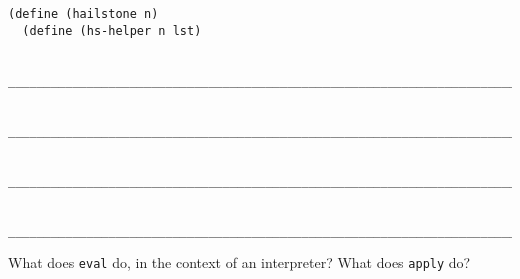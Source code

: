 \documentclass[twoside]{article}
\begin{document}
\begin{enumerate}
\begin{lstlisting}
(define (hailstone n)
  (define (hs-helper n lst)
  
  ________________________________________________________________________
  
  ________________________________________________________________________
    
  ________________________________________________________________________)
  
  ________________________________________________________________________)
\end{lstlisting}


What does {\tt eval} do, in the context of an interpreter? What does {\tt apply} do?

\end{enumerate}
\end{document}
